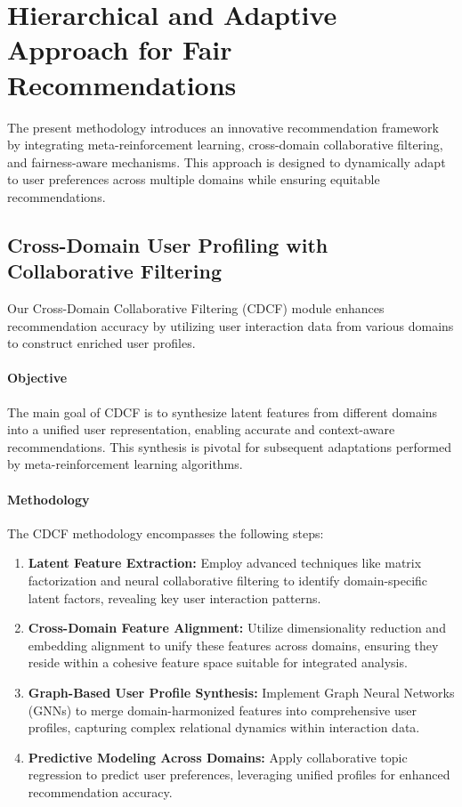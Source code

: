 \documentclass{article} %
\begin{document}
\section{Hierarchical and Adaptive Approach for Fair Recommendations}

The present methodology introduces an innovative recommendation framework by integrating meta-reinforcement learning, cross-domain collaborative filtering, and fairness-aware mechanisms. This approach is designed to dynamically adapt to user preferences across multiple domains while ensuring equitable recommendations.

\subsection{Cross-Domain User Profiling with Collaborative Filtering}

Our Cross-Domain Collaborative Filtering (CDCF) module enhances recommendation accuracy by utilizing user interaction data from various domains to construct enriched user profiles.

\paragraph{Objective}
The main goal of CDCF is to synthesize latent features from different domains into a unified user representation, enabling accurate and context-aware recommendations. This synthesis is pivotal for subsequent adaptations performed by meta-reinforcement learning algorithms.

\paragraph{Methodology}
The CDCF methodology encompasses the following steps:
\begin{enumerate}
    \item \textbf{Latent Feature Extraction:} Employ advanced techniques like matrix factorization  and neural collaborative filtering to identify domain-specific latent factors, revealing key user interaction patterns.
    
    \item \textbf{Cross-Domain Feature Alignment:} Utilize dimensionality reduction and embedding alignment to unify these features across domains, ensuring they reside within a cohesive feature space suitable for integrated analysis.
  
    \item \textbf{Graph-Based User Profile Synthesis:} Implement Graph Neural Networks (GNNs) to merge domain-harmonized features into comprehensive user profiles, capturing complex relational dynamics within interaction data.
    
    \item \textbf{Predictive Modeling Across Domains:} Apply collaborative topic regression to predict user preferences, leveraging unified profiles for enhanced recommendation accuracy.
\end{enumerate}
\end{document}
